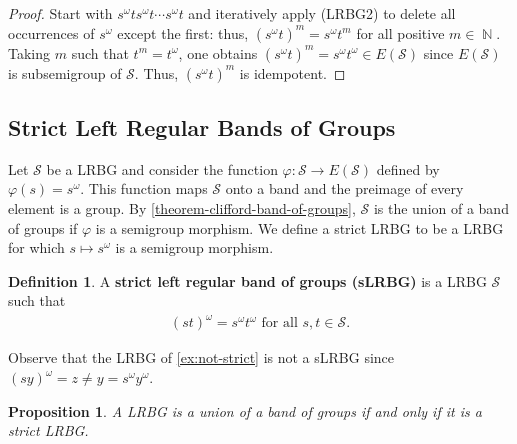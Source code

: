 \documentclass[11pt, oneside, reqno]{amsart}
\newtheorem{prop}[theorem]{Proposition}
\theoremstyle{definition}
\newtheorem{definition}[theorem]{Definition}
\numberwithin{equation}{section}
\DeclareMathOperator{\NN}{\mathbb{N}}
\newcommand{\defn}[1]{{\color{RoyalBlue}\bf#1}}
\def \SS{{\mathcal{S}}}
\begin{document}
\begin{proof}
    Start with $s^\omega t s^\omega t \cdots s^\omega t$
    and iteratively apply (LRBG2) to delete all occurrences of $s^\omega$
    except the first: thus, $(s^\omega t)^m = s^\omega t^m$ for all positive $m
    \in \NN$.
    Taking $m$ such that $t^m = t^\omega$, one obtains
    $(s^\omega t)^m = s^\omega t^\omega \in E(\SS)$
    since $E(\SS)$ is subsemigroup of $\SS$.
    Thus, $(s^\omega t)^m$ is idempotent.
\end{proof}

\subsection{Strict Left Regular Bands of Groups}

Let $\SS$ be a LRBG and consider the function $\varphi: \SS \to E(\SS)$ defined
by $\varphi(s) = s^\omega$.
This function maps $\SS$ onto a band and the preimage of every element is a group.
By \cref{theorem-clifford-band-of-groups}, $\SS$ is the union of a band
of groups if $\varphi$ is a semigroup morphism.
We define a strict LRBG to be a LRBG for which $s \mapsto s^\omega$ is a semigroup morphism.

\begin{definition}
    A \defn{strict left regular band of groups (sLRBG)} is a LRBG $\SS$ such that
    \begin{align}
        \label{eq:strict}
        \tag{sLRBG}     (st)^\omega = s^\omega t^\omega
        \text{~for all $s,t \in \SS$.}
    \end{align}
\end{definition}

Observe that the LRBG of \cref{ex:not-strict} is not a sLRBG since
$(s y)^\omega = z \neq y = s^\omega y^\omega$.

\begin{prop}
    \label{strict-iff-BG}
    A LRBG is a union of a band of groups if and only if it is a strict LRBG.
\end{prop}
\end{document}
